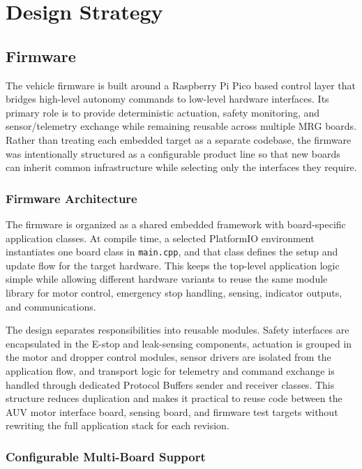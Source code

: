 \documentclass[conference]{IEEEtran}
\begin{document}
\section{Design Strategy}

\subsection{Firmware}

The vehicle firmware is built around a Raspberry Pi Pico based control layer that bridges high-level autonomy commands to low-level hardware interfaces. Its primary role is to provide deterministic actuation, safety monitoring, and sensor/telemetry exchange while remaining reusable across multiple MRG boards. Rather than treating each embedded target as a separate codebase, the firmware was intentionally structured as a configurable product line so that new boards can inherit common infrastructure while selecting only the interfaces they require.

\subsubsection{Firmware Architecture}

The firmware is organized as a shared embedded framework with board-specific application classes. At compile time, a selected PlatformIO environment instantiates one board class in \texttt{main.cpp}, and that class defines the setup and update flow for the target hardware. This keeps the top-level application logic simple while allowing different hardware variants to reuse the same module library for motor control, emergency stop handling, sensing, indicator outputs, and communications.

The design separates responsibilities into reusable modules. Safety interfaces are encapsulated in the E-stop and leak-sensing components, actuation is grouped in the motor and dropper control modules, sensor drivers are isolated from the application flow, and transport logic for telemetry and command exchange is handled through dedicated Protocol Buffers sender and receiver classes. This structure reduces duplication and makes it practical to reuse code between the AUV motor interface board, sensing board, and firmware test targets without rewriting the full application stack for each revision.

\subsubsection{Configurable Multi-Board Support}
\end{document}
